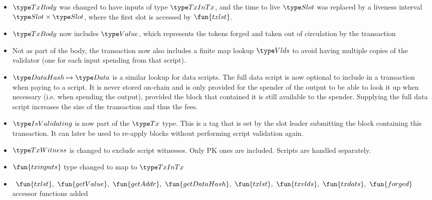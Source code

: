 \begin{itemize}
  \item $\TxBody$ was changed to have inputs of type $\TxInTx$, and the
  time to live $\Slot$ was replaced by a liveness interval $\Slot \times \Slot$,
  where the first slot is accessed by $\fun{txlst}$.
  \item $\TxBody$ now includes $\Value$, which represents
  the tokens forged and taken out of circulation by the transaction
  \item Not as part of the body, the transaction now also includes
  a finite map lookup $\Vlds$ to avoid having multiple
  copies of the validator (one for each input spending from that script).
  \item $\HashDat \mapsto \Data$ is a similar lookup for data scripts.
  The full data script is now optional to include in a transaction when
  paying to a script. It is never
  stored on-chain and is only provided for the spender of the output
  to be able to look it up when necessary (i.e. when spending the output),
  provided the block that contained it is still available to the spender.
  Supplying the full data script increases the size of the transaction and
  thus the fees.
  \item $\IsValidating$ is now part of the $\Tx$ type. This is a tag that is
  set by the slot leader submitting the block containing this transaction.
  It can later be used to re-apply blocks without performing script validation
  again.
  \item $\TxWitness$ is changed to exclude script witnesses. Only PK ones
  are included. Scripts are handled separately.
  \item $\fun{txinputs}$ type changed to map to $\TxInTx$
  \item $~\fun{txlst},~\fun{getValue},~\fun{getAddr}, ~\fun{getDataHash},
  ~\fun{txlst},~\fun{txvlds},~\fun{txdats},
  ~\fun{forged}$
  accessor functions added
\end{itemize}




